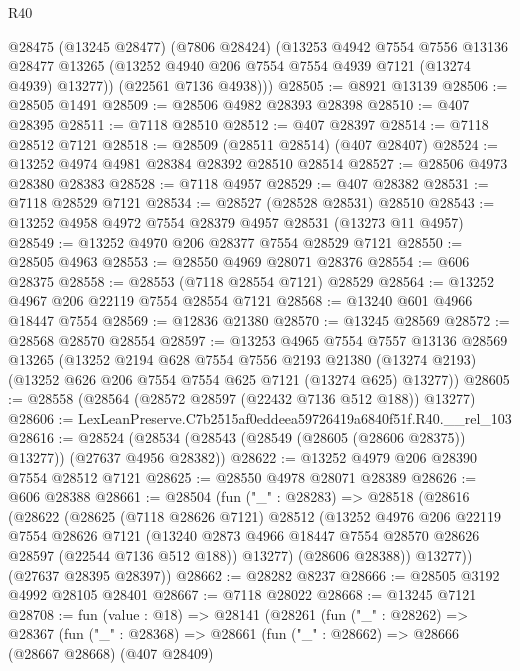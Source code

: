 \begin{lexlean}{R40}
\begin{coremodule}
      @28475
        (@13245 @28477)
        (@7806 @28424)
        (@13253
          @4942
          @7554
          @7556
          @13136
          @28477
          @13265
          (@13252 @4940 @206 @7554 @7554 @4939 @7121 (@13274 @4939) @13277))
        (@22561 @7136 @4938)))
@28505 := @8921 @13139
@28506 := @28505 @1491
@28509 := @28506 @4982 @28393 @28398
@28510 := @407 @28395
@28511 := @7118 @28510
@28512 := @407 @28397
@28514 := @7118 @28512 @7121
@28518 := @28509 (@28511 @28514) (@407 @28407)
@28524 := @13252 @4974 @4981 @28384 @28392 @28510 @28514
@28527 := @28506 @4973 @28380 @28383
@28528 := @7118 @4957
@28529 := @407 @28382
@28531 := @7118 @28529 @7121
@28534 := @28527 (@28528 @28531) @28510
@28543 := @13252 @4958 @4972 @7554 @28379 @4957 @28531 (@13273 @11 @4957)
@28549 := @13252 @4970 @206 @28377 @7554 @28529 @7121
@28550 := @28505 @4963
@28553 := @28550 @4969 @28071 @28376
@28554 := @606 @28375
@28558 := @28553 (@7118 @28554 @7121) @28529
@28564 := @13252 @4967 @206 @22119 @7554 @28554 @7121
@28568 := @13240 @601 @4966 @18447 @7554
@28569 := @12836 @21380
@28570 := @13245 @28569
@28572 := @28568 @28570 @28554
@28597 := @13253
    @4965
    @7554
    @7557
    @13136
    @28569
    @13265
    (@13252
      @2194
      @628
      @7554
      @7556
      @2193
      @21380
      (@13274 @2193)
      (@13252 @626 @206 @7554 @7554 @625 @7121 (@13274 @625) @13277))
@28605 := @28558 (@28564 (@28572 @28597 (@22432 @7136 @512 @188)) @13277)
@28606 := LexLeanPreserve.C7b2515af0eddeea59726419a6840f51f.R40.__rel_103
@28616 := @28524 (@28534 (@28543 (@28549 (@28605 (@28606 @28375)) @13277)) (@27637 @4956 @28382))
@28622 := @13252 @4979 @206 @28390 @7554 @28512 @7121
@28625 := @28550 @4978 @28071 @28389
@28626 := @606 @28388
@28661 := @28504
    (fun ("_" : @28283) =>
    @28518
      (@28616
        (@28622
          (@28625
            (@7118 @28626 @7121)
            @28512
            (@13252
              @4976
              @206
              @22119
              @7554
              @28626
              @7121
              (@13240 @2873 @4966 @18447 @7554 @28570 @28626 @28597 (@22544 @7136 @512 @188))
              @13277)
            (@28606 @28388))
          @13277))
      (@27637 @28395 @28397))
@28662 := @28282 @8237
@28666 := @28505 @3192 @4992 @28105 @28401
@28667 := @7118 @28022
@28668 := @13245 @7121
@28708 := fun (value : @18) =>
  @28141
    (@28261
      (fun ("_" : @28262) =>
      @28367
        (fun ("_" : @28368) =>
        @28661
          (fun ("_" : @28662) =>
          @28666
            (@28667 @28668)
            (@407 @28409)

\end{coremodule}
\end{lexlean}
